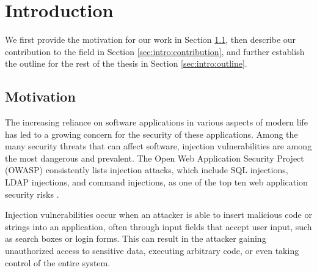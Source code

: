\chapter{Introduction}
\label{chapter:introduction}

\begin{comment}
	Your introduction goes here
	\begin{itemize}
		\item Generic description of the broad field of research
		\item Current state of research
		\item What's the gap that you're trying to fill?
		\item Short motivation
		\item Summary of the most important results
		\item Your contribution
		\item Structure of the thesis
	\end{itemize}
	
	1-2.5 pages
	
	This text is not too detailed. Start quite high-level, then narrow down until
	you reach your topic. After the introduction, the reader must want to read the
	rest of your thesis and understand the relevance. However, it doesn't have to
	be super technical.
\end{comment}

We first provide the motivation for our work in Section \ref{sec:intro:motivation}, then describe our contribution to the field in Section \ref{sec:intro:contribution}, and further establish the outline for the rest of the thesis in Section \ref{sec:intro:outline}.

\section{Motivation}\label{sec:intro:motivation}

The increasing reliance on software applications in various aspects of modern life has led to a growing concern for the security of these applications. Among the many security threats that can affect software, injection vulnerabilities are among the most dangerous and prevalent. The Open Web Application Security Project (OWASP) consistently lists injection attacks, which include SQL injections, LDAP injections, and command injections, as one of the top ten web application security risks \cite{owasp}.

Injection vulnerabilities occur when an attacker is able to insert malicious code or strings into an application, often through input fields that accept user input, such as search boxes or login forms. This can result in the attacker gaining unauthorized access to sensitive data, executing arbitrary code, or even taking control of the entire system.

